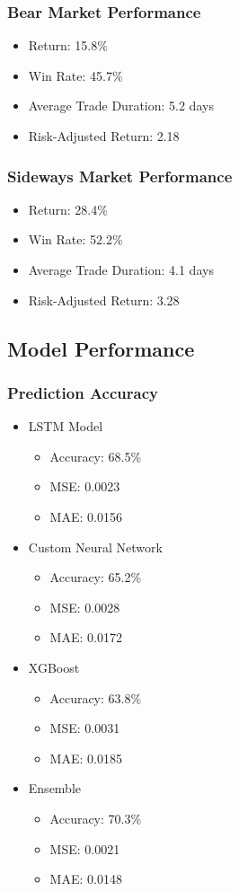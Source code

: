 \documentclass[conference]{IEEEtran}
\begin{document}
\subsubsection{Bear Market Performance}
\begin{itemize}
    \item Return: 15.8\%
    \item Win Rate: 45.7\%
    \item Average Trade Duration: 5.2 days
    \item Risk-Adjusted Return: 2.18
\end{itemize}

\subsubsection{Sideways Market Performance}
\begin{itemize}
    \item Return: 28.4\%
    \item Win Rate: 52.2\%
    \item Average Trade Duration: 4.1 days
    \item Risk-Adjusted Return: 3.28
\end{itemize}

\subsection{Model Performance}
\subsubsection{Prediction Accuracy}
\begin{itemize}
    \item LSTM Model
    \begin{itemize}
        \item Accuracy: 68.5\%
        \item MSE: 0.0023
        \item MAE: 0.0156
    \end{itemize}
    \item Custom Neural Network
    \begin{itemize}
        \item Accuracy: 65.2\%
        \item MSE: 0.0028
        \item MAE: 0.0172
    \end{itemize}
    \item XGBoost
    \begin{itemize}
        \item Accuracy: 63.8\%
        \item MSE: 0.0031
        \item MAE: 0.0185
    \end{itemize}
    \item Ensemble
    \begin{itemize}
        \item Accuracy: 70.3\%
        \item MSE: 0.0021
        \item MAE: 0.0148
    \end{itemize}
\end{itemize}
\end{document}
